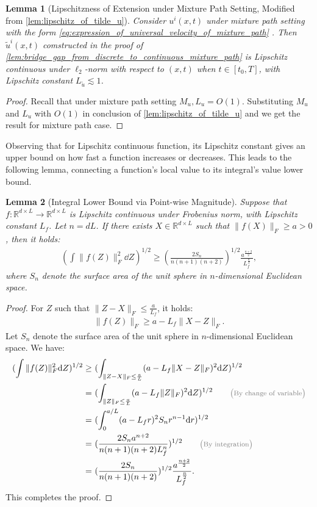\documentclass[12pt]{article}
\numberwithin{equation}{section}
\let\tilde\widetilde
\newcommand{\wt}{\widetilde}
\renewcommand{\tilde}{\wt}
\def\R{\mathbb{R}}
\theoremstyle{theoremstyle}
\newtheorem{lemma}{Lemma}[section]
\numberwithin{equation}{section}
\numberwithin{theorem}{section}
\numberwithin{proposition}{section}
\numberwithin{definition}{section}
\numberwithin{lemma}{section}
\numberwithin{assumption}{section}
\numberwithin{remark}{section}
\newcommand*{\annot}[1]{\tag*{\footnotesize{\textcolor{black!50}{\big(#1\big)}}}}
\begin{document}
\begin{lemma}[Lipschitzness of Extension under Mixture Path Setting, Modified from \cref{lem:lipschitz_of_tilde_u}]\label{lem:lipschitz_of_tilde_u_mixture_path}
Consider $u^i(x,t)$ under mixture path setting with the form \eqref{eq:expression_of_universal_velocity_of_mixture_path} .
Then $\tilde{u}^i(x,t)$ comstructed in the proof of \cref{lem:bridge_gap_from_discrete_to_continuous_mixture_path} is Lipschitz continuous under $\ell_2$-norm with respect to $(x,t)$ when $t\in[t_0,T]$, with Lipschitz constant $L_{\tilde{u}}\lesssim 1$. 
\end{lemma}

\begin{proof}
Recall that under mixture path setting $M_u,L_u=O(1)$.
Substituting $M_u$ and $L_u$ with $O(1)$ in conclusion of \cref{lem:lipschitz_of_tilde_u} and we get the result for mixture path case.
\end{proof}


Observing that for Lipschitz continuous function, its Lipschitz constant gives an upper bound on how fast a function increases or decreases.
This leads to the following lemma, connecting a function's local value to its integral's value lower bound.

\begin{lemma}[Integral Lower Bound via Point-wise Magnitude]\label{lem:bound_integral_with_local_lipschitz}
Suppose that $f:\R^{d\times L}\to \R^{d\times L}$ is Lipschitz continuous under Frobenius norm, with Lipschitz constant $L_f$.
Let $n=dL$.
If there exists $X\in\R^{d\times L}$ such that $\|f(X)\|_F\geq a>0$, then it holds:
\begin{align*}
    (\int\|f(Z)\|_F^2\dd Z)^{1/2}\geq (\frac{2S_n}{n(n+1)(n+2)})^{1/2}\frac{a^\frac{n+2}{2}}{L_f^\frac{n}{2}},
\end{align*}
where $S_n$ denote the surface area of the unit sphere in $n$-dimensional Euclidean space.
\end{lemma}

\begin{proof}
For $Z$ such that $\|Z-X\|_F\leq\frac{a}{L_f}$, it holds:
\begin{align*}
    \|f(Z)\|_F\geq a-L_f\|X-Z\|_F.
\end{align*}
Let $S_n$ denote the surface area of the unit sphere in $n$-dimensional Euclidean space.
We have:
\begin{align*}
    (\int\|f(Z)\|_F^2\dd Z)^{1/2}\geq & ~
    (\int_{\|Z-X\|_F\leq\frac{a}{L}}(a-L_f\|X-Z\|_F)^2\dd Z)^{1/2} \\
    = & ~
    (\int_{\|Z\|_F\leq\frac{a}{L}}(a-L_f\|Z\|_F)^2\dd Z)^{1/2}
    \annot{By change of variable}\\
    = & ~
    (\int_0^{a/L}(a-L_fr)^2S_nr^{n-1}\dd r)^{1/2}\\
    = & ~
    (\frac{2S_na^{n+2}}{n(n+1)(n+2)L_f^n})^{1/2} 
    \annot{By integration}\\
    = & ~
    (\frac{2S_n}{n(n+1)(n+2)})^{1/2}\frac{a^\frac{n+2}{2}}{L_f^\frac{n}{2}}.
\end{align*}
This completes the proof.
\end{proof}
\end{document}
